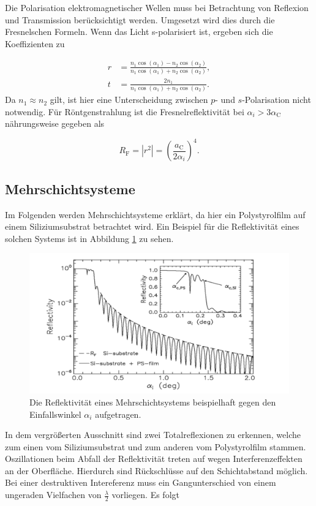 Die Polarisation elektromagnetischer Wellen muss bei Betrachtung von Reflexion und Transmission berücksichtigt werden. Umgesetzt
wird dies durch die Fresnelschen Formeln. Wenn das Licht s-polarisiert ist, ergeben sich die Koeffizienten zu 

\begin{align*}
    r &= \frac{n_1 \cos{\left(\alpha_1\right)}-n_2 \cos{\left(\alpha_2\right)}}{n_1 \cos{\left(\alpha_1\right)}+n_2 \cos{\left(\alpha_2\right)}},\\
    t &= \frac{2n_1}{n_1 \cos{\left(\alpha_1\right)}+n_2 \cos{\left(\alpha_2\right)}}.
\end{align*}
Da $n_1 \approx n_2$ gilt, ist hier eine Unterscheidung zwischen $p$- und $s$-Polarisation nicht notwendig.
Für Röntgenstrahlung ist die Fresnelreflektivität bei $\alpha_i > 3\alpha_\text{C}$ nährungsweise gegeben als

\begin{equation*}
    R_\text{F} = |r^2| = \left(\frac{a_\text{C}}{2\alpha_i}\right)^4.
\end{equation*}

\subsection{Mehrschichtsysteme}
Im Folgenden werden Mehrschichtsysteme erklärt, da hier ein Polystyrolfilm auf einem Siliziumsubstrat betrachtet wird.
Ein Beispiel für die Reflektivität eines solchen Systems ist in Abbildung \ref{fig:mss} zu sehen. 

\begin{figure}
  \centering
  \includegraphics[scale=0.45]{figures/Evtl.png}
  \caption{Die Reflektivität eines Mehrschichtsystems beispielhaft gegen den Einfallswinkel $\alpha_i$ aufgetragen.\cite{Tolan}}
  \label{fig:mss}
\end{figure}
\noindent
In dem vergrößerten Ausschnitt sind zwei Totalreflexionen zu erkennen, welche zum einen vom Siliziumsubstrat und zum anderen
vom Polystyrolfilm stammen. Oszillationen beim Abfall der Reflektivität treten auf wegen Interferenzeffekten an der Oberfläche.
Hierdurch sind Rückschlüsse auf den Schichtabstand möglich. Bei einer destruktiven Intereferenz muss ein Gangunterschied von 
einem ungeraden Vielfachen von $\frac{\lambda}{2}$ vorliegen. Es folgt

